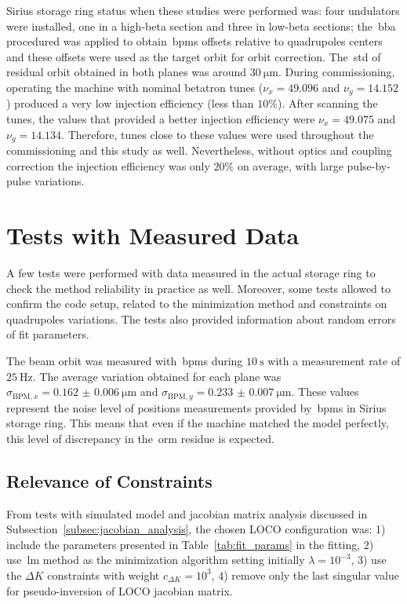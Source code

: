 Sirius storage ring status when these studies were performed was: four undulators were installed, one in a high-beta section and three in low-beta sections; the~\gls{bba} procedured was applied to obtain~\glspl{bpm} offsets relative to quadrupoles centers and these offsets were used as the target orbit for orbit correction. The~\gls{std} of residual orbit obtained in both planes was around $\SI{30}{\micro\meter}$. During commissioning, operating the machine with nominal betatron tunes ($\nu_x = 49.096$ and $\nu_y = 14.152$) produced a very low injection efficiency (less than $10\%$). After scanning the tunes, the values that provided a better injection efficiency were $\nu_x = 49.075$ and $\nu_y = 14.134$. Therefore, tunes close to these values were used throughout the commissioning and this study as well. Nevertheless, without optics and coupling correction the injection efficiency was only $20\%$ on average, with large pulse-by-pulse variations.
\section{Tests with Measured Data}\label{sec:tests_measured}
A few tests were performed with data measured in the actual storage ring to check the method reliability in practice as well. Moreover, some tests allowed to confirm the code setup, related to the minimization method and constraints on quadrupoles variations. The tests also provided information about random errors of fit parameters.

The beam orbit was measured with~\glspl{bpm} during $\SI{10}{\second}$ with a measurement rate of $\SI{25}{\hertz}$. The average variation obtained for each plane was $\sigma_{\mathrm{BPM}, x} = \SI{0.162(6)}{\micro\meter}$ and $\sigma_{\mathrm{BPM}, y} = \SI{0.233(7)}{\micro\meter}$. These values represent the noise level of positions measurements provided by~\glspl{bpm} in Sirius storage ring. This means that even if the machine matched the model perfectly, this level of discrepancy in the~\gls{orm} residue is expected.

\subsection{Relevance of Constraints}\label{subsec:loco_config}
From tests with simulated model and jacobian matrix analysis discussed in Subsection~\ref{subsec:jacobian_analysis}, the chosen LOCO configuration was: 1) include the parameters presented in Table~\ref{tab:fit_params} in the fitting, 2) use~\gls{lm} method as the minimization algorithm setting initially $\lambda = 10^{-3}$, 3) use the $\Delta K$ constraints with weight $c_{\Delta K} = 10^{3}$, 4) remove only the last singular value for pseudo-inversion of LOCO jacobian matrix. 

